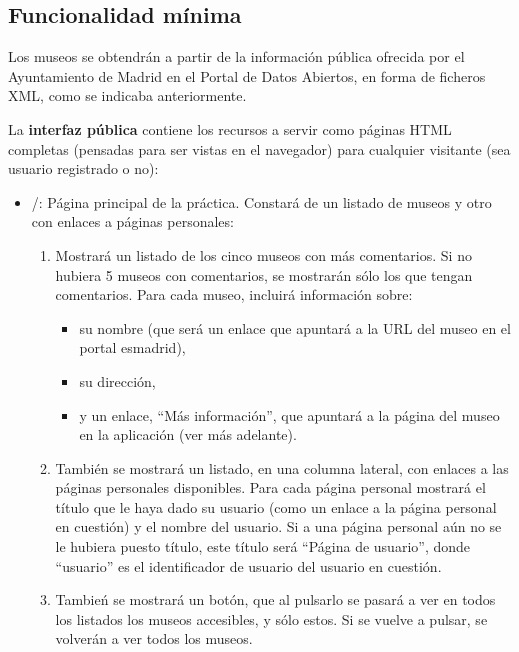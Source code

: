 \subsection{Funcionalidad mínima}

Los museos se obtendrán a partir de la información pública ofrecida por el Ayuntamiento de Madrid en el Portal de Datos Abiertos, en forma de ficheros XML, como se indicaba anteriormente.

La {\bf interfaz pública} contiene los recursos a servir como páginas HTML completas (pensadas para ser vistas en el navegador) para cualquier visitante (sea usuario registrado o no):

\begin{itemize}
  \item /: Página principal de la práctica. Constará de un listado de museos y otro con enlaces a páginas personales:
  
  \begin{enumerate}
    \item Mostrará un listado de los cinco museos con más comentarios. Si no hubiera 5 museos con comentarios, se mostrarán sólo los que tengan comentarios. Para cada museo, incluirá información sobre:
    \begin{itemize}
      \item su nombre (que será un enlace que apuntará a la URL del museo en el portal esmadrid), 
      \item su dirección,
      \item y un enlace, ``Más información'', que apuntará a la página del museo en la aplicación (ver más adelante).
    \end{itemize}
   
  \item También se mostrará un listado, en una columna lateral, con enlaces a las páginas personales disponibles. Para cada página personal mostrará el título que le haya dado su usuario (como un enlace a la página personal en cuestión) y el nombre del usuario. Si a una página personal aún no se le hubiera puesto título, este título será ``Página de usuario'', donde ``usuario'' es el identificador de usuario del usuario en cuestión.
    \item Tambień se mostrará un botón, que al pulsarlo se pasará a ver en todos los listados los museos accesibles, y sólo estos. Si se vuelve a pulsar, se volverán a ver todos los museos.
   \end{enumerate}


\end{itemize}
